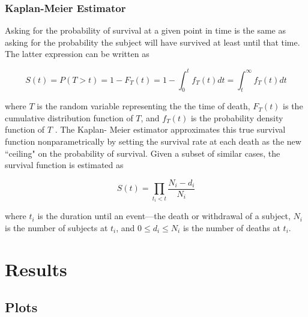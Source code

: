 \documentclass[12pt,titlepage]{article}
\begin{document}
      \subsubsection{Kaplan-Meier Estimator}
        Asking for the probability of survival at a given point in time is the
        same as asking for the probability the subject will have survived at
        least until that time. The latter expression can be written as

        $$S(t) = P(T > t) = 1 - F_T(t) = 1 - \int_0^t f_T(t) dt = \int_t^\infty f_T(t) dt$$

        where $T$ is the random variable representing the the time of death,
        $F_T(t)$ is the cumulative distribution function of $T$, and $f_T(t)$
        is the probability density function of $T$ \cite{rochford}. The Kaplan-
        Meier estimator approximates this true survival function
        nonparametrically by setting the survival rate at each death as the new
        ``ceiling" on the probability of survival. Given a subset of similar
        cases, the survival function is estimated as

        $$S(t) = \prod_{t_i < t} \frac{N_i - d_i}{N_i}$$

        where $t_i$ is the duration until an event---the death or withdrawal of
        a subject, $N_i$ is the number of subjects at $t_i$, and $0 \leq d_i
        \leq N_i$ is the number of deaths at $t_i$.





  \section{Results}
    \subsection{Plots}
      
\end{document}

